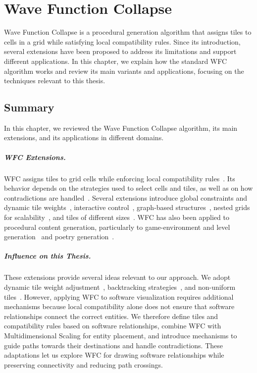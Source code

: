\documentclass[../../main.tex]{subfiles}
\begin{document}
\chapter{Wave Function Collapse}
Wave Function Collapse is a procedural generation algorithm that assigns tiles to cells in a grid while satisfying local compatibility rules. Since its introduction, several extensions have been proposed to address its limitations and support different applications. In this chapter, we explain how the standard WFC algorithm works and review its main variants and applications, focusing on the techniques relevant to this thesis.




\section{Summary}

In this chapter, we reviewed the Wave Function Collapse algorithm, its main extensions, and its applications in different domains.

\paragraph{WFC Extensions.}
WFC assigns tiles to grid cells while enforcing local compatibility rules~. Its behavior depends on the strategies used to select cells and tiles, as well as on how contradictions are handled~. Several extensions introduce global constraints and dynamic tile weights~, interactive control~, graph-based structures~, nested grids for scalability~, and tiles of different sizes~. WFC has also been applied to procedural content generation, particularly to game-environment and level generation~ and poetry generation~.

\paragraph{Influence on this Thesis.}
These extensions provide several ideas relevant to our approach. We adopt dynamic tile weight adjustment~, backtracking strategies~, and non-uniform tiles~. However, applying WFC to software visualization requires additional mechanisms because local compatibility alone does not ensure that software relationships connect the correct entities. We therefore define tiles and compatibility rules based on software relationships, combine WFC with Multidimensional Scaling for entity placement, and introduce mechanisms to guide paths towards their destinations and handle contradictions. These adaptations let us explore WFC for drawing software relationships while preserving connectivity and reducing path crossings.
\end{document}
